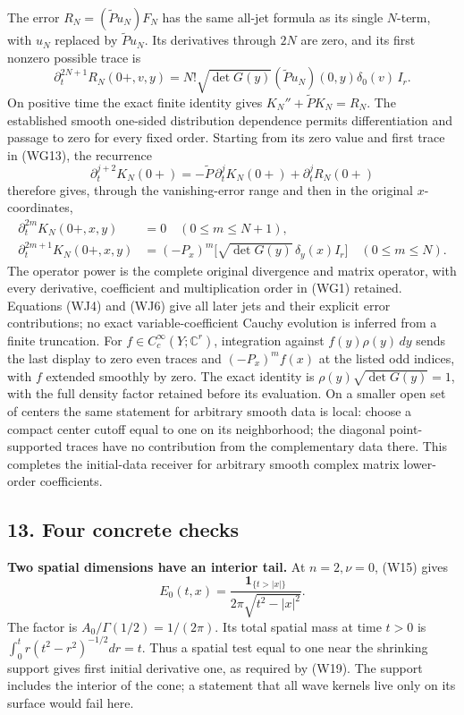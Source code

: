 \documentclass[
  11pt,
]{article}
\begin{document}
The error \(R_N=(\widetilde Pu_N)F_N\) has the same all-jet formula as
its single \(N\)-term, with \(u_N\) replaced by \(\widetilde Pu_N\). Its
derivatives through \(2N\) are zero, and its first nonzero possible
trace is \[
 \partial_t^{2N+1}R_N(0+,v,y)
   =N!\sqrt{\det G(y)}
                 (\widetilde Pu_N)(0,y)\delta_0(v)\,I_r .
 \tag{WJ5}
\] On positive time the exact finite identity gives
\(K_N''+\widetilde PK_N=R_N\). The established smooth one-sided
distribution dependence permits differentiation and passage to zero for
every fixed order. Starting from its zero value and first trace in
(WG13), the recurrence \[
 \partial_t^{j+2}K_N(0+)
      =-\widetilde P\,\partial_t^jK_N(0+)
                           +\partial_t^jR_N(0+)
 \tag{WJ6}
\] therefore gives, through the vanishing-error range and then in the
original \(x\)-coordinates, \[
\begin{split}
 \partial_t^{2m}K_N(0+,x,y)&=0
                                  \quad(0\leq m\leq N+1),\\
 \partial_t^{2m+1}K_N(0+,x,y)
      &=(-P_x)^m\big[\sqrt{\det G(y)}\,\delta_y(x)I_r\big]
                                  \quad(0\leq m\leq N).
\end{split}
 \tag{WJ7}
\] The operator power is the complete original divergence and matrix
operator, with every derivative, coefficient and multiplication order in
(WG1) retained. Equations (WJ4) and (WJ6) give all later jets and their
explicit error contributions; no exact variable-coefficient Cauchy
evolution is inferred from a finite truncation. For
\(f\in C_c^\infty(Y;\mathbb C^r)\), integration against
\(f(y)\rho(y)\,dy\) sends the last display to zero even traces and
\((-P_x)^m f(x)\) at the listed odd indices, with \(f\) extended
smoothly by zero. The exact identity is \(\rho(y)\sqrt{\det G(y)}=1\),
with the full density factor retained before its evaluation. On a
smaller open set of centers the same statement for arbitrary smooth data
is local: choose a compact center cutoff equal to one on its
neighborhood; the diagonal point-supported traces have no contribution
from the complementary data there. This completes the initial-data
receiver for arbitrary smooth complex matrix lower-order coefficients.

\subsection{13. Four concrete checks}\label{four-concrete-checks}

\textbf{Two spatial dimensions have an interior tail.} At \(n=2,\nu=0\),
(W15) gives \[
 E_0(t,x)=\frac{\boldsymbol1_{\{t>|x|\}}}{2\pi\sqrt{t^2-|x|^2}}.
 \tag{WX1}
\] The factor is \(A_0/\Gamma(1/2)=1/(2\pi)\). Its total spatial mass at
time \(t>0\) is \(\int_0^t r(t^2-r^2)^{-1/2}dr=t\). Thus a spatial test
equal to one near the shrinking support gives first initial derivative
one, as required by (W19). The support includes the interior of the
cone; a statement that all wave kernels live only on its surface would
fail here.
\end{document}
